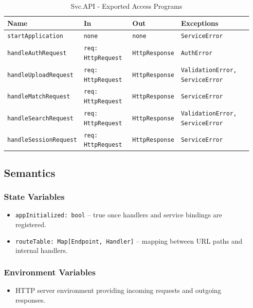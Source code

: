 \documentclass[12pt, titlepage]{article}
\begin{document}
\begin{table}[H]
\centering
\small
\caption{Svc.API - Exported Access Programs}
\begin{tabular}{p{4cm} p{2.9cm} p{2.9cm} p{4.2cm}}
\toprule
\textbf{Name} & \textbf{In} & \textbf{Out} & \textbf{Exceptions} \\
\midrule
\texttt{startApplication} & \texttt{none} & \texttt{none} & \texttt{ServiceError} \\
\texttt{handleAuthRequest} & \texttt{req: HttpRequest} & \texttt{HttpResponse} & \texttt{AuthError} \\
\texttt{handleUploadRequest} & \texttt{req: HttpRequest} & \texttt{HttpResponse} & \texttt{ValidationError, ServiceError} \\
\texttt{handleMatchRequest} & \texttt{req: HttpRequest} & \texttt{HttpResponse} & \texttt{ServiceError} \\
\texttt{handleSearchRequest} & \texttt{req: HttpRequest} & \texttt{HttpResponse} & \texttt{ValidationError, ServiceError} \\
\texttt{handleSessionRequest} & \texttt{req: HttpRequest} & \texttt{HttpResponse} & \texttt{ServiceError} \\
\bottomrule
\end{tabular}
\end{table}

\subsection{Semantics}

\subsubsection{State Variables}
\begin{itemize}
    \item \texttt{appInitialized: bool} – true once handlers and service bindings are registered.
    \item \texttt{routeTable: Map[Endpoint, Handler]} – mapping between URL paths and internal handlers.
\end{itemize}

\subsubsection{Environment Variables}
\begin{itemize}
    \item HTTP server environment providing incoming requests and outgoing responses.
\end{itemize}
\end{document}
